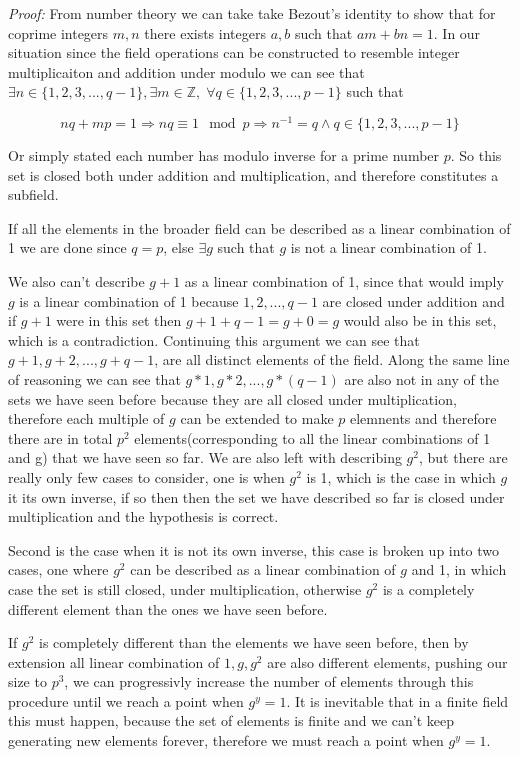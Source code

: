 \documentclass[11pt]{article}
\newcommand\0{\mathbf{0}}
\newcommand\<{\langle}
\renewcommand\>{\rangle}
\begin{document}
\begin{enumerate}
\textit{Proof:} From number theory we can take take Bezout's identity to show that for
coprime integers $m,n$ there exists integers $a,b$ such that $am+bn=1$. In our situation
since the field operations can be constructed to resemble integer multiplicaiton and addition under modulo
we can see that $\exists n\in \{1,2,3,...,q-1\}, \exists m \in \mathbb{Z},  \;  \forall q \in \{1,2,3,...,p-1\}$
such that 

$$nq + mp = 1 \Rightarrow nq \equiv 1 \mod p \Rightarrow n^{-1} = q \wedge q \in \{1,2,3,...,p-1\}$$

Or simply stated each number has modulo inverse for a prime number $p$. So this set is closed both 
under addition and multiplication, and therefore constitutes a subfield.


If all the elements in  the broader field can be described as a linear combination of 1 we are done since $q=p$, 
else $\exists g$ such that $g$ is not a linear combination of 1.

We also can't describe $g+1$ as a linear combination of 1, since that would imply $g$ is a linear combination of 1
because $1,2,..., q-1$ are closed under addition and if $g+1$ were in this set then $g+1+q-1=g+0=g$ would 
also be in this set, which is a contradiction. Continuing this argument we can see that $g+1, g+2, ..., g+q-1$, 
are all distinct elements of the field. Along the same line of reasoning we can see that $g*1, g*2, ..., g*(q-1)$
are also not in any of the sets we have seen before because they are all closed under multiplication, therefore each
multiple of $g$ can be extended to make $p$ elemnents and therefore there are in total $p^2$ elements(corresponding to all the linear combinations of 1 and g) that we
have seen so far. We are also left with describing $g^2$, but there are really only few cases to consider, one is when $g^2$ is 1,
which is the case in which $g$ it its own inverse, if so then then the set we have described so far
is closed under multiplication and the hypothesis is correct.

Second is the case when it is not its own inverse, this case is broken up into two cases, one 
where $g^2$ can be described as a linear combination of $g$ and 1, in which case the set is still closed, 
under multiplication, otherwise $g^2$ is a completely different element than the ones we have seen before.

If $g^2$ is completely different than the elements we have seen before, then by extension all linear combination 
of $1, g, g^2$ are also different elements, pushing our size to $p^3$, we can progressivly increase 
the number of elements through this procedure until we reach a point when $g^y=1$. It is inevitable 
that in a finite field this must happen, because the set of elements is finite and we can't keep generating 
new elements forever, therefore we must reach a point when $g^y=1$.


\end{enumerate}
\end{document}
